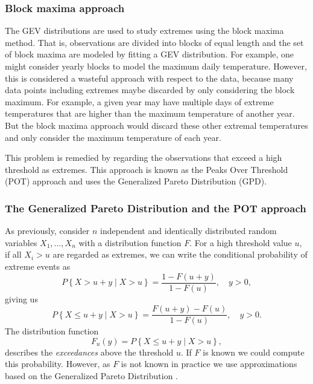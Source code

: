 \documentclass[11pt,a4paper,]{article}
\theoremstyle{definition}
\theoremstyle{definition}
\theoremstyle{definition}
\theoremstyle{remark}
\begin{document}
\hypertarget{block-maxima-approach}{%
\subsubsection{Block maxima approach}\label{block-maxima-approach}}

The GEV distributions are used to study extremes using the block maxima method. That is, observations are divided into blocks of equal length and the set of block maxima are modeled by fitting a GEV distribution. For example, one might consider yearly blocks to model the maximum daily temperature. However, this is considered a wasteful approach with respect to the data, because many data points including extremes maybe discarded by only considering the block maximum. For example, a given year may have multiple days of extreme temperatures that are higher than the maximum temperature of another year. But the block maxima approach would discard these other extremal temperatures and only consider the maximum temperature of each year.

This problem is remedied by regarding the observations that exceed a high threshold as extremes. This approach is known as the Peaks Over Threshold (POT) approach and uses the Generalized Pareto Distribution (GPD).

\hypertarget{sec:potapproach}{%
\subsubsection{The Generalized Pareto Distribution and the POT approach}\label{sec:potapproach}}

As previously, consider \(n\) independent and identically distributed random variables \(X_1, \dots, X_n\) with a distribution function \(F\). For a high threshold value \(u\), if all \(X_i > u\) are regarded as extremes, we can write the conditional probability of extreme events as
\begin{equation}\label{eq:POT1}
    P\left \{X > u + y \mid X > u \right \} = \frac{1 - F(u+y)}{1 - F(u)} , \quad y >0  ,
\end{equation}
giving us
\begin{equation}\label{eq:POT2}
    P\left \{X \leq u + y \mid X > u \right \} = \frac{ F(u+y) - F(u)}{1 - F(u)} , \quad y >0  .
\end{equation}
The distribution function
\begin{equation}\label{eq:POT3}
    F_u(y) = P\left \{X \leq u + y \mid X > u \right \} ,
\end{equation}
describes the \emph{exceedances} above the threshold \(u\). If \(F\) is known we could compute this probability. However, as \(F\) is not known in practice we use approximations based on the Generalized Pareto Distribution \autocite{Pickands1975}.
\end{document}
